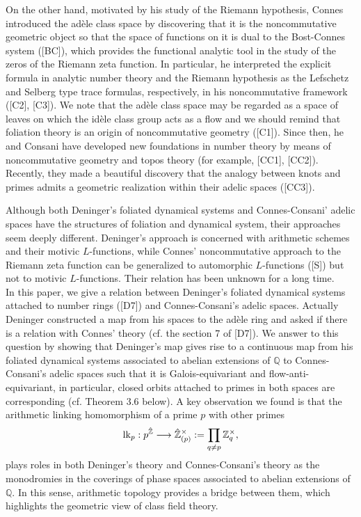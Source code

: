 \documentclass[12pt, leqno]{article}
\begin{document}
On the other hand, motivated by his study of the Riemann hypothesis, Connes introduced the ad\`{e}le class space  by discovering that it is the  noncommutative geometric object so that the space of functions on it is dual to the Bost-Connes system ([BC]), which provides the functional analytic tool in the study of the zeros of the Riemann zeta function. In particular,  he interpreted the explicit formula in analytic number theory and the Riemann hypothesis as the Lefschetz and Selberg type trace formulas, respectively,  in his noncommutative framework ([C2], [C3]).  We note that the ad\`{e}le class space may be regarded as a space of leaves on which the id\`{e}le class group acts as a flow and we should remind that foliation theory is an origin of noncommutative geometry ([C1]). 
Since then, he and Consani  have developed new foundations in number theory by means of noncommutative geometry and topos theory (for example, [CC1], [CC2]). 
Recently, they made a beautiful discovery that the analogy between knots and primes admits a geometric realization within their adelic  spaces ([CC3]).

Although both  Deninger's foliated dynamical systems and Connes-Consani' adelic spaces have the structures of foliation and dynamical system, 
their approaches seem deeply different.  Deninger's approach is concerned with arithmetic schemes and their motivic $L$-functions, while Connes' noncommutative approach to the Riemann zeta function can be generalized to automorphic $L$-functions ([S]) but not to motivic $L$-functions. Their relation has been unknown for a long time.  \\

In this paper, we give a relation between Deninger's foliated dynamical systems attached to number rings ([D7]) and Connes-Consani's adelic spaces.  Actually Deninger constructed a map from his spaces to the ad\`{e}le ring and asked if there is a relation with Connes' theory (cf. the section 7 of [D7]).  We answer to this question by showing that  Deninger's map gives rise to  a continuous map from  his foliated dynamical systems associated to abelian extensions of $\mathbb{Q}$ to Connes-Consani's adelic spaces such that it is Galois-equivariant and flow-anti-equivariant, in particular, closed orbits attached to primes in both spaces are corresponding (cf. Theorem 3.6 below).  A key observation  we found is that the arithmetic linking homomorphism of a prime $p$ with other primes
$$ {\rm lk}_p :  p^{\hat{\mathbb{Z}}} \longrightarrow \hat{\mathbb{Z}}_{(p)}^{\times} := \prod_{q \neq p} \mathbb{Z}_q ^{\times},$$
plays roles in both Deninger's theory and Connes-Consani's theory as the monodromies in the coverings of phase spaces associated to abelian extensions of $\mathbb{Q}$. In this sense, arithmetic topology provides a bridge between them, which highlights  the geometric view of class field theory.  \\
\end{document}
